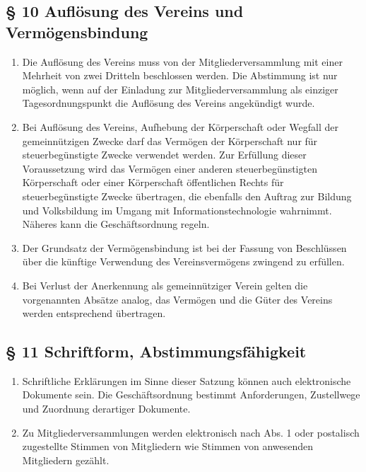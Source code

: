 ﻿\documentclass[10pt,a4paper]{scrartcl}
\begin{document}
\subsection*{§ 10 Auflösung des Vereins und Vermögensbindung}
\begin{enumerate}
	\item Die Auflösung des Vereins muss von der Mitgliederversammlung mit einer Mehrheit von
		zwei Dritteln beschlossen werden. Die Abstimmung ist nur möglich, wenn auf der Einladung
		zur Mitgliederversammlung als einziger Tagesordnungspunkt die Auflösung des Vereins
		angekündigt wurde.
	\item Bei Auflösung des Vereins, Aufhebung der Körperschaft oder Wegfall der
		gemeinnützigen Zwecke darf das Vermögen der Körperschaft nur für
		steuerbegünstigte Zwecke verwendet werden. Zur Erfüllung dieser
		Voraussetzung wird das Vermögen einer anderen steu\-er\-be\-güns\-tig\-ten
		Körperschaft oder einer Körperschaft öffentlichen Rechts für
		steuerbegünstigte Zwecke über\-tra\-gen, die ebenfalls den Auftrag
		zur Bildung und Volksbildung im Umgang mit Informationstechnologie
		wahrnimmt. Nä\-he\-res kann die Geschäftsordnung regeln.
	\item Der Grundsatz der Vermögensbindung ist bei der Fassung von
		Beschlüssen über die künf\-ti\-ge Verwendung des Vereinsvermögens zwingend
		zu erfüllen.
	\item Bei Verlust der Anerkennung als gemeinnütziger Verein gelten die vorgenannten Absätze analog, 
		das Vermögen und die Güter des Vereins werden entsprechend übertragen.
\end{enumerate}
%
%
\subsection*{§ 11 Schriftform, Abstimmungsfähigkeit}
\begin{enumerate}
	\item Schriftliche Erklärungen im Sinne dieser Satzung können auch
		elektronische Dokumente sein. Die Geschäftsordnung bestimmt
		Anforderungen, Zustellwege und Zuordnung derartiger Dokumente.
	\item Zu Mitgliederversammlungen werden elektronisch nach Abs. 1 oder
		postalisch zugestellte Stimmen von Mitgliedern wie Stimmen
		von anwesenden Mitgliedern gezählt.
\end{enumerate}
\end{document}
